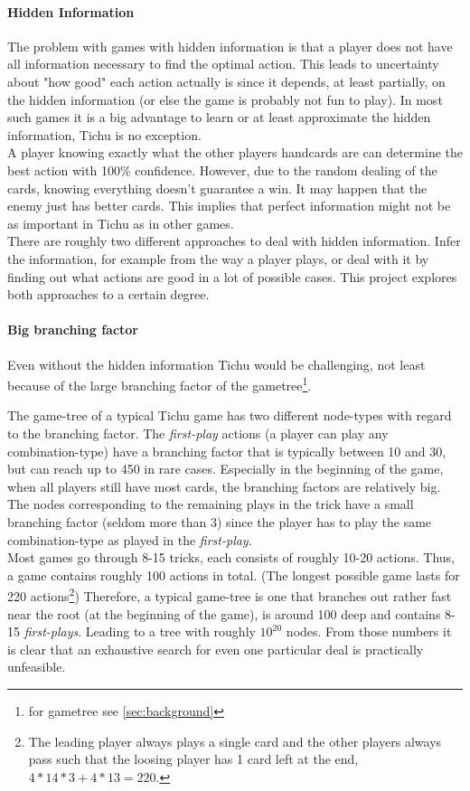 \paragraph{Hidden Information}
\label{par:hiddeninfo}
The problem with games with hidden information is that a player does not have all information necessary to find the optimal action. This leads to uncertainty about "how good" each action actually is since it depends, at least partially, on the hidden information (or else the game is probably not fun to play). In most such games it is a big advantage to learn or at least approximate the hidden information, Tichu is no exception. \\
A player knowing exactly what the other players handcards are can determine the best action with 100\% confidence. However, due to the random dealing of the cards, knowing everything doesn't guarantee a win. It may happen that the enemy just has better cards. This implies that perfect information might not be as important in Tichu as in other games.\\ %
There are roughly two different approaches to deal with hidden information. Infer the information, for example from the way a player plays, or deal with it by finding out what actions are good in a lot of possible cases.
This project explores both approaches to a certain degree.

\paragraph{Big branching factor}
\label{par:branchingfactor}
Even without the hidden information Tichu would be challenging, not least because of the large branching factor of the gametree\footnote{for gametree see \ref{sec:background}}.

The game-tree of a typical Tichu game has two different node-types with regard to the branching factor.
The \textit{first-play} actions (a player can play any combination-type) have a branching factor that is typically between 10 and 30, but can reach up to 450 in rare cases. Especially in the beginning of the game, when all players still have most cards, the branching factors are relatively big.
The nodes corresponding to the remaining plays in the trick have a small branching factor (seldom more than 3) since the player has to play the same combination-type as played in the \textit{first-play}.\\
Most games go through 8-15 tricks, each consists of roughly 10-20 actions. Thus, a game contains roughly 100 actions in total. (The longest possible game lasts for 220 actions\footnote{The leading player always plays a single card and the other players always pass such that the loosing player has 1 card left at the end, $4*14*3 + 4*13 = 220$.})
Therefore, a typical game-tree is one that branches out rather fast near the root (at the beginning of the game), is around 100 deep and contains 8-15 \textit{first-plays}. Leading to a tree with roughly $10^{20}$ nodes.
From those numbers it is clear that an exhaustive search for even one particular deal is practically unfeasible.

